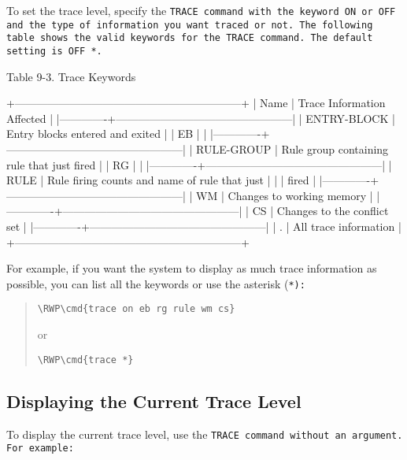 To set the trace level, specify the \tt{TRACE} command with the
keyword \tt{ON} or \tt{OFF} and the type of information you want
traced or not. The following table shows the valid keywords for the
\tt{TRACE} command. The default setting is \tt{OFF *}.

Table 9-3. Trace Keywords

+--------------------------------------------------------------+
| Name        | Trace Information Affected                     |
|-------------+------------------------------------------------|
| ENTRY-BLOCK | Entry blocks entered and exited                |
| EB          |                                                |
|-------------+------------------------------------------------|
| RULE-GROUP  | Rule group containing rule that just fired     |
| RG          |                                                |
|-------------+------------------------------------------------|
| RULE        | Rule firing counts and name of rule that just  |
|             | fired                                          |
|-------------+------------------------------------------------|
| WM          | Changes to working memory                      |
|-------------+------------------------------------------------|
| CS          | Changes to the conflict set                    |
|-------------+------------------------------------------------|
| .           | All trace information                          |
+--------------------------------------------------------------+

For example, if you want the system to display as much trace
information as possible, you can list all the keywords or use
the asterisk (\tt{*}):
\begin{quote}
\begin{Verbatim}[commandchars=\\\{\}]
\RWP\cmd{trace on eb rg rule wm cs}
\end{Verbatim}
or
\begin{Verbatim}[commandchars=\\\{\}]
\RWP\cmd{trace *}
\end{Verbatim}
\end{quote}

\subsection{Displaying the Current Trace Level}

To display the current trace level, use the \tt{TRACE} command without
an argument. For example:

